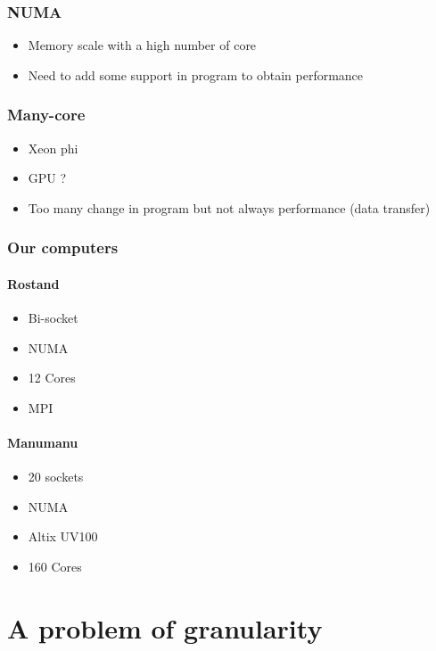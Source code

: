 \documentclass[oneside,12t]{classes/Thesis}
\begin{document}
\subsection{NUMA}
  \begin{itemize}
    \item Memory scale with a high number of core
    \item Need to add some support in program to obtain performance
  \end{itemize}
\subsection{Many-core}
  \begin{itemize}
    \item Xeon phi
    \item GPU ?
    \item Too many change in program but not always performance (data transfer)
  \end{itemize}
\subsection{Our computers}
\subsubsection{Rostand}
  \begin{itemize}
    \item Bi-socket
    \item NUMA
    \item 12 Cores
    \item MPI
  \end{itemize}
\subsubsection{Manumanu}
  \begin{itemize}
    \item 20 sockets
    \item NUMA
    \item Altix UV100
    \item 160 Cores
  \end{itemize}






\chapter{A problem of granularity}
\minitoc
\vspace{1cm}
\end{document}
